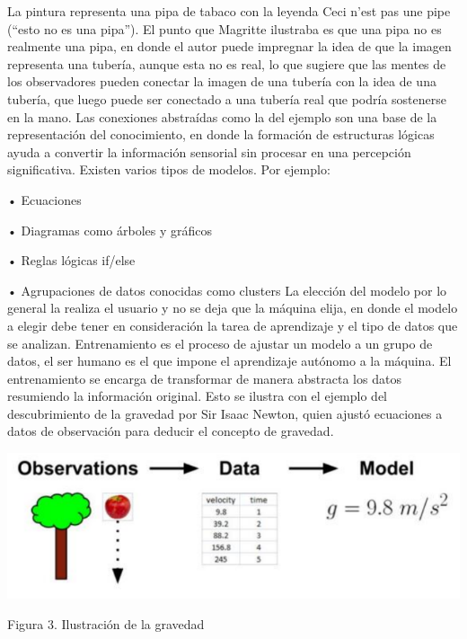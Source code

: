 \documentclass[
  letterpaper,
  DIV=11,
  numbers=noendperiod]{scrartcl}
\begin{document}
La pintura representa una pipa de tabaco con la leyenda Ceci n'est pas
une pipe (``esto no es una pipa''). El punto que Magritte ilustraba es
que una pipa no es realmente una pipa, en donde el autor puede impregnar
la idea de que la imagen representa una tubería, aunque esta no es real,
lo que sugiere que las mentes de los observadores pueden conectar la
imagen de una tubería con la idea de una tubería, que luego puede ser
conectado a una tubería real que podría sostenerse en la mano. Las
conexiones abstraídas como la del ejemplo son una base de la
representación del conocimiento, en donde la formación de estructuras
lógicas ayuda a convertir la información sensorial sin procesar en una
percepción significativa. Existen varios tipos de modelos. Por ejemplo:

• Ecuaciones

• Diagramas como árboles y gráficos

• Reglas lógicas if/else

• Agrupaciones de datos conocidas como clusters La elección del modelo
por lo general la realiza el usuario y no se deja que la máquina elija,
en donde el modelo a elegir debe tener en consideración la tarea de
aprendizaje y el tipo de datos que se analizan. Entrenamiento es el
proceso de ajustar un modelo a un grupo de datos, el ser humano es el
que impone el aprendizaje autónomo a la máquina. El entrenamiento se
encarga de transformar de manera abstracta los datos resumiendo la
información original. Esto se ilustra con el ejemplo del descubrimiento
de la gravedad por Sir Isaac Newton, quien ajustó ecuaciones a datos de
observación para deducir el concepto de gravedad.

\begin{Figura 3. Ilustración de la gravedad}

{\centering \includegraphics{cap3.png}

}

\caption{Figura 3. Ilustración de la gravedad}

\end{Figura 3. Ilustración de la gravedad}
\end{document}
